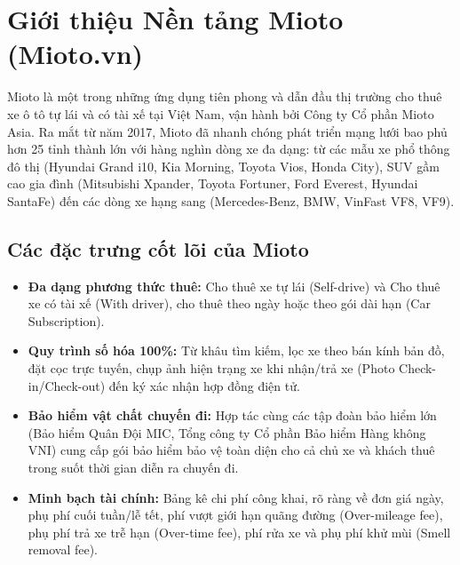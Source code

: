 \documentclass[12pt,a4paper,oneside]{report}
\begin{document}
\section{Giới thiệu Nền tảng Mioto (Mioto.vn)}
Mioto là một trong những ứng dụng tiên phong và dẫn đầu thị trường cho thuê xe ô tô tự lái và có tài xế tại Việt Nam, vận hành bởi Công ty Cổ phần Mioto Asia. Ra mắt từ năm 2017, Mioto đã nhanh chóng phát triển mạng lưới bao phủ hơn 25 tỉnh thành lớn với hàng nghìn dòng xe đa dạng: từ các mẫu xe phổ thông đô thị (Hyundai Grand i10, Kia Morning, Toyota Vios, Honda City), SUV gầm cao gia đình (Mitsubishi Xpander, Toyota Fortuner, Ford Everest, Hyundai SantaFe) đến các dòng xe hạng sang (Mercedes-Benz, BMW, VinFast VF8, VF9).

\subsection{Các đặc trưng cốt lõi của Mioto}
\begin{itemize}
  \item \textbf{Đa dạng phương thức thuê:} Cho thuê xe tự lái (Self-drive) và Cho thuê xe có tài xế (With driver), cho thuê theo ngày hoặc theo gói dài hạn (Car Subscription).
  \item \textbf{Quy trình số hóa 100\%:} Từ khâu tìm kiếm, lọc xe theo bán kính bản đồ, đặt cọc trực tuyến, chụp ảnh hiện trạng xe khi nhận/trả xe (Photo Check-in/Check-out) đến ký xác nhận hợp đồng điện tử.
  \item \textbf{Bảo hiểm vật chất chuyến đi:} Hợp tác cùng các tập đoàn bảo hiểm lớn (Bảo hiểm Quân Đội MIC, Tổng công ty Cổ phần Bảo hiểm Hàng không VNI) cung cấp gói bảo hiểm bảo vệ toàn diện cho cả chủ xe và khách thuê trong suốt thời gian diễn ra chuyến đi.
  \item \textbf{Minh bạch tài chính:} Bảng kê chi phí công khai, rõ ràng về đơn giá ngày, phụ phí cuối tuần/lễ tết, phí vượt giới hạn quãng đường (Over-mileage fee), phụ phí trả xe trễ hạn (Over-time fee), phí rửa xe và phụ phí khử mùi (Smell removal fee).
\end{itemize}
\end{document}
